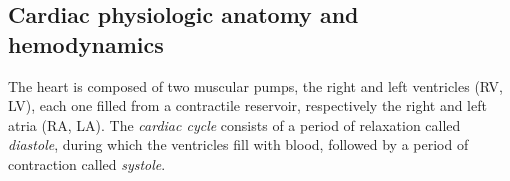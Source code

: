 





%
%
%
\subsection{Cardiac physiologic anatomy and hemodynamics}
The heart is composed of two muscular pumps, the right and left ventricles (\acs{RV}, \acs{LV}), each one filled from a contractile reservoir, respectively the right and left atria (\acs{RA}, \acs{LA}). The \textit{cardiac cycle} consists of a period of relaxation called \textit{diastole}, during which the ventricles fill with blood, followed by a period of contraction called \textit{systole}.

